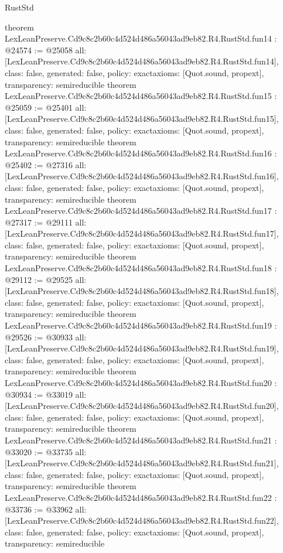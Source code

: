 \begin{lexlean}{RustStd}
\begin{coremodule}
{}
theorem LexLeanPreserve.Cd9c8c2b60c4d524d486a56043ad9eb82.R4.RustStd.fun14 : @24574 := @25058 {
  all: [LexLeanPreserve.Cd9c8c2b60c4d524d486a56043ad9eb82.R4.RustStd.fun14],
  class: false,
  generated: false,
  policy: exact{axioms: [Quot.sound, propext]},
  transparency: semireducible
}
theorem LexLeanPreserve.Cd9c8c2b60c4d524d486a56043ad9eb82.R4.RustStd.fun15 : @25059 := @25401 {
  all: [LexLeanPreserve.Cd9c8c2b60c4d524d486a56043ad9eb82.R4.RustStd.fun15],
  class: false,
  generated: false,
  policy: exact{axioms: [Quot.sound, propext]},
  transparency: semireducible
}
theorem LexLeanPreserve.Cd9c8c2b60c4d524d486a56043ad9eb82.R4.RustStd.fun16 : @25402 := @27316 {
  all: [LexLeanPreserve.Cd9c8c2b60c4d524d486a56043ad9eb82.R4.RustStd.fun16],
  class: false,
  generated: false,
  policy: exact{axioms: [Quot.sound, propext]},
  transparency: semireducible
}
theorem LexLeanPreserve.Cd9c8c2b60c4d524d486a56043ad9eb82.R4.RustStd.fun17 : @27317 := @29111 {
  all: [LexLeanPreserve.Cd9c8c2b60c4d524d486a56043ad9eb82.R4.RustStd.fun17],
  class: false,
  generated: false,
  policy: exact{axioms: [Quot.sound, propext]},
  transparency: semireducible
}
theorem LexLeanPreserve.Cd9c8c2b60c4d524d486a56043ad9eb82.R4.RustStd.fun18 : @29112 := @29525 {
  all: [LexLeanPreserve.Cd9c8c2b60c4d524d486a56043ad9eb82.R4.RustStd.fun18],
  class: false,
  generated: false,
  policy: exact{axioms: [Quot.sound, propext]},
  transparency: semireducible
}
theorem LexLeanPreserve.Cd9c8c2b60c4d524d486a56043ad9eb82.R4.RustStd.fun19 : @29526 := @30933 {
  all: [LexLeanPreserve.Cd9c8c2b60c4d524d486a56043ad9eb82.R4.RustStd.fun19],
  class: false,
  generated: false,
  policy: exact{axioms: [Quot.sound, propext]},
  transparency: semireducible
}
theorem LexLeanPreserve.Cd9c8c2b60c4d524d486a56043ad9eb82.R4.RustStd.fun20 : @30934 := @33019 {
  all: [LexLeanPreserve.Cd9c8c2b60c4d524d486a56043ad9eb82.R4.RustStd.fun20],
  class: false,
  generated: false,
  policy: exact{axioms: [Quot.sound, propext]},
  transparency: semireducible
}
theorem LexLeanPreserve.Cd9c8c2b60c4d524d486a56043ad9eb82.R4.RustStd.fun21 : @33020 := @33735 {
  all: [LexLeanPreserve.Cd9c8c2b60c4d524d486a56043ad9eb82.R4.RustStd.fun21],
  class: false,
  generated: false,
  policy: exact{axioms: [Quot.sound, propext]},
  transparency: semireducible
}
theorem LexLeanPreserve.Cd9c8c2b60c4d524d486a56043ad9eb82.R4.RustStd.fun22 : @33736 := @33962 {
  all: [LexLeanPreserve.Cd9c8c2b60c4d524d486a56043ad9eb82.R4.RustStd.fun22],
  class: false,
  generated: false,
  policy: exact{axioms: [Quot.sound, propext]},
  transparency: semireducible
}
\end{coremodule}
\end{lexlean}
